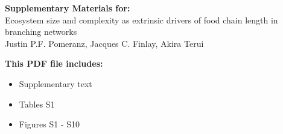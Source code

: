 \begin{center}
\vspace*{5mm}
\LARGE{\textbf{Supplementary Materials for:}}\\[7.5mm]
\LARGE{Ecosystem size and complexity as extrinsic drivers of food chain length in branching networks}\\[7.5mm]
\large{Justin P.F. Pomeranz, Jacques C. Finlay, Akira Terui}\\[7.5mm]
\end{center}
\begin{flushleft}
\textbf{This PDF file includes:}
\begin{itemize}
\item Supplementary text
\item Tables S1
\item Figures S1 - S10
\end{itemize}
\end{flushleft}

\newpage